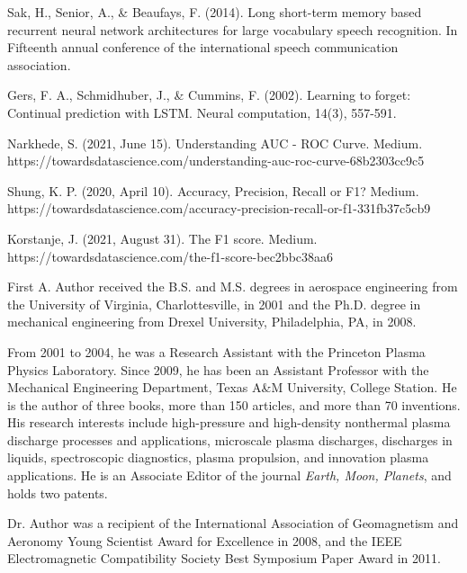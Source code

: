 \documentclass{ieeeaccess}
\begin{document}
\begin{thebibliography}{00}
 Sak, H., Senior, A., \& Beaufays, F. (2014). Long short-term memory based recurrent neural network architectures for large vocabulary speech recognition. In Fifteenth annual conference of the international speech communication association.

 Gers, F. A., Schmidhuber, J., \& Cummins, F. (2002). Learning to forget: Continual prediction with LSTM. Neural computation, 14(3), 557-591.

 Narkhede, S. (2021, June 15). Understanding AUC - ROC Curve. Medium. https://towardsdatascience.com/understanding-auc-roc-curve-68b2303cc9c5

 Shung, K. P. (2020, April 10). Accuracy, Precision, Recall or F1? Medium. https://towardsdatascience.com/accuracy-precision-recall-or-f1-331fb37c5cb9

 Korstanje, J. (2021, August 31). The F1 score. Medium. https://towardsdatascience.com/the-f1-score-bec2bbc38aa6

\end{thebibliography}

\begin{IEEEbiography}{First A. Author} received the B.S. and M.S. degrees in aerospace engineering from
the University of Virginia, Charlottesville, in 2001 and the Ph.D. degree in
mechanical engineering from Drexel University, Philadelphia, PA, in 2008.

From 2001 to 2004, he was a Research Assistant with the Princeton Plasma
Physics Laboratory. Since 2009, he has been an Assistant Professor with the
Mechanical Engineering Department, Texas A{\&}M University, College Station.
He is the author of three books, more than 150 articles, and more than 70
inventions. His research interests include high-pressure and high-density
nonthermal plasma discharge processes and applications, microscale plasma
discharges, discharges in liquids, spectroscopic diagnostics, plasma
propulsion, and innovation plasma applications. He is an Associate Editor of
the journal \emph{Earth, Moon, Planets}, and holds two patents.

Dr. Author was a recipient of the International Association of Geomagnetism
and Aeronomy Young Scientist Award for Excellence in 2008, and the IEEE
Electromagnetic Compatibility Society Best Symposium Paper Award in 2011.
\end{IEEEbiography}
\end{document}
